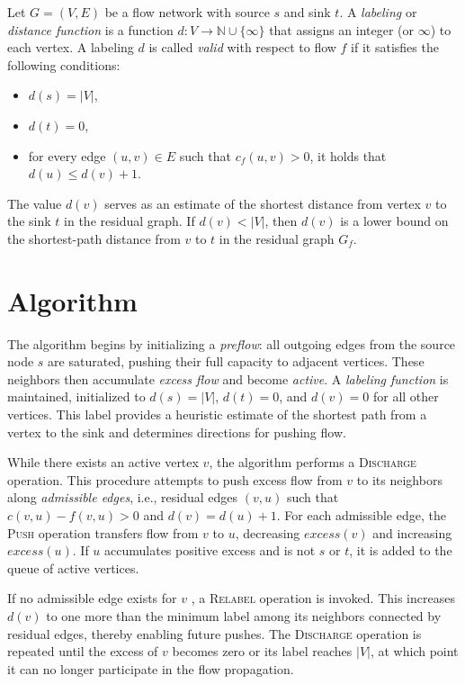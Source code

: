 \begin{defn}
Let $G = (V, E)$ be a flow network with source $s$ and sink $t$.  
A \emph{labeling} or \emph{distance function} is a function $d : V \to \mathbb{N} \cup \{\infty\}$ that assigns an integer (or $\infty$) to each vertex. A labeling $d$ is called \emph{valid} with respect to flow $f$ if it satisfies the following conditions:
\begin{itemize}
    \item $d(s) = |V|$,
    \item $d(t) = 0$,
    \item for every edge $(u,v) \in E$ such that $c_f(u,v) > 0$, it holds that $d(u) \leq d(v) + 1$.
\end{itemize}
\end{defn}
The value $d(v)$ serves as an estimate of the shortest distance from vertex $v$ to the sink $t$ in the residual graph. If $d(v) < |V|$, then $d(v)$ is a lower bound on the shortest-path distance from $v$ to $t$ in the residual graph $G_f$.


\section{Algorithm}

The algorithm begins by initializing a \emph{preflow}: all outgoing edges from the source node $s$ are saturated, pushing their full capacity to adjacent vertices. These neighbors then accumulate \emph{excess flow} and become \emph{active}. A \emph{labeling function} is maintained, initialized to $ d(s) = |V| $, $ d(t) = 0 $, and $ d(v) = 0 $ for all other vertices. This label provides a heuristic estimate of the shortest path from a vertex to the sink and determines directions for pushing flow.

While there exists an active vertex $v$, the algorithm performs a \textsc{Discharge} operation. This procedure attempts to push excess flow from $v$ to its neighbors along \emph{admissible edges}, i.e., residual edges  $(v, u)$  such that $ c(v, u) - f(v, u) > 0 $ and $ d(v) = d(u) + 1 $. For each admissible edge, the \textsc{Push} operation transfers flow from $v$ to $u$, decreasing $excess(v)$ and increasing $excess(u)$. If $u$ accumulates positive excess and is not $s$ or $t$, it is added to the queue of active vertices.

If no admissible edge exists for  $v$ , a \textsc{Relabel} operation is invoked. This increases $d(v)$ to one more than the minimum label among its neighbors connected by residual edges, thereby enabling future pushes. The \textsc{Discharge} operation is repeated until the excess of $v$ becomes zero or its label reaches $|V|$, at which point it can no longer participate in the flow propagation.

